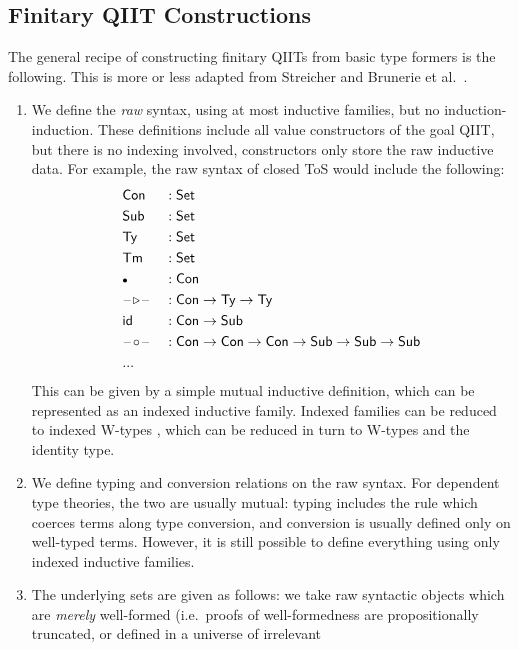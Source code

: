 \documentclass[12pt,a4paper,twoside,openany]{book}
\theoremstyle{remark}
\theoremstyle{definition}
\theoremstyle{theorem}
\newcommand{\id}{\mathsf{id}}
\newcommand{\Con}{\mathsf{Con}}
\newcommand{\Sub}{\mathsf{Sub}}
\newcommand{\Tm}{\mathsf{Tm}}
\newcommand{\Ty}{\mathsf{Ty}}
\newcommand{\blank}{\mathord{\hspace{1pt}\text{--}\hspace{1pt}}}
\newcommand{\Set}{\mathsf{Set}}
\newcommand{\ext}{\triangleright}
\newcommand{\emptycon}{\scaleobj{.75}\bullet}
\begin{document}
\subsection{Finitary QIIT Constructions}
\label{sec:fqiit-constructions}

The general recipe of constructing finitary QIITs from basic type formers is the
following. This is more or less adapted from Streicher \cite{streicher93habil}
and Brunerie et al.\ \cite{brunerie}.
\begin{enumerate}
  \item
    We define the \emph{raw} syntax, using at most inductive families, but
    no induction-induction. These definitions include all value constructors of
    the goal QIIT, but there is no indexing involved, constructors only store
    the raw inductive data. For example, the raw syntax of closed ToS would
    include the following:
    \begin{alignat*}{3}
      & \Con &&: \Set \\
      & \Sub &&: \Set \\
      & \Ty  &&: \Set \\
      & \Tm  &&: \Set \\
      & \emptycon &&: \Con \\
      & \blank\!\ext\!\blank &&: \Con \to \Ty \to \Ty \\
      & \id &&: \Con \to \Sub \\
      & \blank\!\circ\!\blank &&: \Con \to \Con \to \Con \to \Sub \to \Sub \to \Sub\\
      & ... &&
    \end{alignat*}
    This can be given by a simple mutual inductive definition, which can be
    represented as an indexed inductive family. Indexed families can be
    reduced to indexed W-types \cite{mutualinductive}, which can be
    reduced in turn to W-types and the identity type.
  \item
    We define typing and conversion relations on the raw syntax. For dependent
    type theories, the two are usually mutual: typing includes the rule which
    coerces terms along type conversion, and conversion is usually defined only
    on well-typed terms.  However, it is still possible to define everything
    using only indexed inductive families.
  \item
    The underlying sets are given as follows: we take raw syntactic objects
    which are \emph{merely} well-formed (i.e.\ proofs of well-formedness are
    propositionally truncated, or defined in a universe of irrelevant

\end{enumerate}
\end{document}
